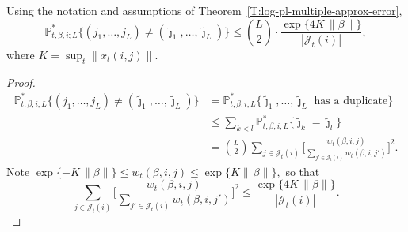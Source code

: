 \documentclass[final]{statsoc}
\newcommand{\qedhere}{}
\begin{document}
\begin{lemma}\label{L:coupling-prob-bound}
Using the notation and assumptions of
Theorem~\ref{T:log-pl-multiple-approx-error},
\[
    \mathbb{P}^\ast_{t,\beta,i;L}
    \Big\{
        (j_1, \ldots, j_L)
            \neq
            (\tilde \jmath_1, \ldots, \tilde \jmath_L)
    \Big\}
        \leq
        \binom{L}{2}
        \cdot
        \frac{\exp\{4 K \, \| \beta \|\}}{| \mathcal{J}_t(i) |},
\]
where $K = \sup_t \| x_t(i,j) \|$.
\end{lemma}
\begin{proof}
\begin{align*}
    \mathbb{P}^\ast_{t,\beta,i;L}
    \Big\{
        (j_1, \ldots, j_L)
            \neq
            (\tilde \jmath_1, \ldots, \tilde \jmath_L)
    \Big\}
        &=
        \mathbb{P}^\ast_{t,\beta,i;L}
        \Big\{
            \text{$\tilde \jmath_1, \ldots, \tilde \jmath_L$ has a duplicate}
        \} \\
        &\leq
        \sum_{k < l}
            \mathbb{P}^\ast_{t,\beta,i;L}
            \Big\{
                \tilde \jmath_k = \tilde \jmath_l
            \Big\} \\
        &=
            \binom{L}{2}
            \sum_{j \in \mathcal{J}_t(i)}
                \Big[
                    \frac{
                        w_t(\beta, i, j)
                    }{
                        \sum_{j' \in \mathcal{J}_t(i)} w_t(\beta, i, j')
                    }
                \Big]^2.
\end{align*}
Note
\(
    \exp\{-K \, \| \beta \|\}
        \leq w_t(\beta,i,j)
        \leq \exp\{K \| \, \beta \|\},
\)
so that
\[
    \sum_{j \in \mathcal{J}_t(i)}
        \Big[
            \frac{
                w_t(\beta, i, j)
            }{
                \sum_{j' \in \mathcal{J}_t(i)} w_t(\beta, i, j')
            }
        \Big]^2
    \leq
        \frac{\exp\{4 K \, \| \beta \|\}}{| \mathcal{J}_t(i) |}.
    \qedhere
\]
\end{proof}
\end{document}
